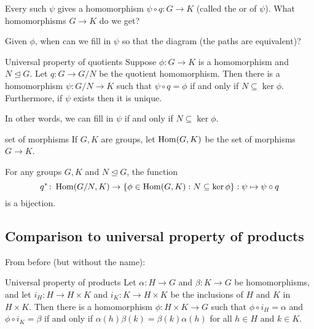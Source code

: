 \documentclass[12pt,letterpaper]{report}
\begin{document}
Every such $\psi$ gives a homomorphism $\psi \circ q \colon G \to K$ (called the  or
 of $\psi$).
What homomorphisms $G \to K$ do we get?

\begin{center}
\end{center}

Given $\phi$, when can we fill in $\psi$ so that the diagram  (the paths are
equivalent)?

\begin{thm}{Universal property of quotients}{}
  Suppose $\phi \colon G \to K$ is a homomorphism and $N \trianglelefteq G$.
  Let $q \colon G \to G/N$ be the quotient homomorphism.
  Then there is a homomorphism $\psi \colon G/N \to K$ such that $\psi \circ q = \phi$ if and only
  if $N \subseteq \ker\phi$.
  Furthermore, if $\psi$ exists then it is unique.
\end{thm}

In other words, we can fill in $\psi$ if and only if $N \subseteq \ker\phi$.

\begin{defn}{set of morphisms}{}
  If $G, K$ are groups, let $\operatorname{Hom}(G, K)$ be the set of morphisms $G \to K$.
\end{defn}

\begin{cor}{}{}
  For any groups $G, K$ and $N \trianglelefteq G$, the function
  \[
    q^* \colon \operatorname{Hom}(G/N, K) \to \{\phi \in \operatorname{Hom}(G, K) : N \subseteq \ker\phi\}
      : \psi \mapsto \psi \circ q
  \]
  is a bijection.
\end{cor}

\pagebreak
\subsection{Comparison to universal property of products}

From before (but without the name):
\begin{thm}{Universal property of products}{}
  Let $\alpha \colon H \to G$ and $\beta \colon K \to G$ be homomorphisms, and let
  $i_H \colon H \to H \times K$ and $i_K \colon K \to H \times K$ be the inclusions of $H$ and $K$
  in $H \times K$.
  Then there is a homomorphism $\phi \colon H \times K \to G$ such that $\phi \circ i_H = \alpha$
  and $\phi \circ i_K = \beta$ if and only if $\alpha(h)\beta(k) = \beta(k)\alpha(h)$ for all
  $h \in H$ and $k \in K$.
\end{thm}
\end{document}
